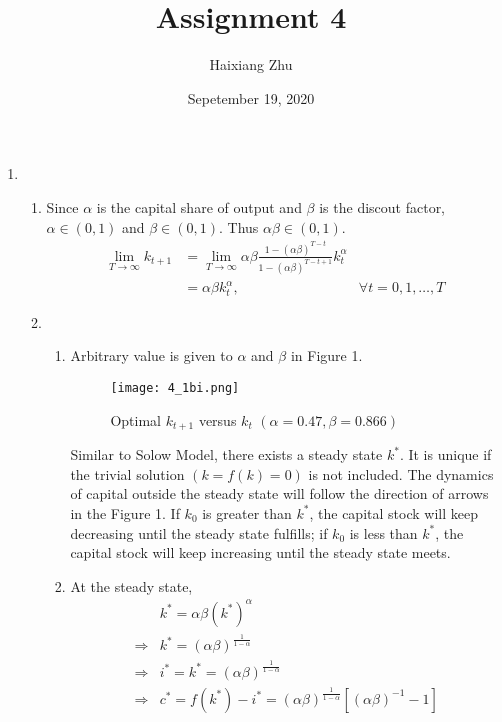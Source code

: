 \documentclass{article}
\title{Assignment 4}
\date{Sepetember 19, 2020}
\author{Haixiang Zhu}
\begin{document}
    \maketitle
    \renewcommand{\arraystretch}{1.2}
    \begin{enumerate}
        \item 
        \begin{enumerate}
            \item Since $\alpha$ is the capital share of output and $\beta$ is the discout factor,$\alpha\in(0,1)$ and $\beta\in(0,1)$. Thus $\alpha\beta\in(0,1)$.
            \begin{align*}
                \lim_{T\to\infty}k_{t+1}&=\lim_{T\to\infty}\alpha\beta\frac{1-(\alpha\beta)^{T-t}}{1-(\alpha\beta)^{T-t+1}}k_t^\alpha\\
                &=\alpha\beta k_t^\alpha,&\forall t=0,1,\dots,T
            \end{align*}
        \item 
            \begin{enumerate}
                \item Arbitrary value is given to $\alpha$ and $\beta$ in Figure 1.
                \begin{figure}[h!]
                    \texttt{[image: 4\_1bi.png]}
                    \caption{Optimal $k_{t+1}$ versus $k_t$ $(\alpha=0.47,\beta=0.866)$}
                \end{figure}
                Similar to Solow Model, there exists a steady state $k^\ast$. It is unique if the trivial solution $(k=f(k)=0)$ is not included. The dynamics of capital outside
                the steady state will follow the direction of arrows in the Figure 1. If $k_0$ is greater than $k^\ast$, the capital stock will keep decreasing until the steady state fulfills; if $k_0$ is less than $k^\ast$, the capital stock will
                keep increasing until the steady state meets. 
                \item At the steady state, 
                \begin{align*}
                    &k^\ast=\alpha\beta (k^\ast)^\alpha\\
                    \Rightarrow&k^\ast=(\alpha\beta)^{\frac{1}{1-\alpha}}\\
                    \Rightarrow&i^\ast=k^\ast=(\alpha\beta)^{\frac{1}{1-\alpha}}\\
                    \Rightarrow&c^\ast=f(k^\ast)-i^\ast=(\alpha\beta)^{\frac{1}{1-\alpha}}[(\alpha\beta)^{-1}-1]

\end{align*}
\end{enumerate}
\end{enumerate}
\end{enumerate}
\end{document}
